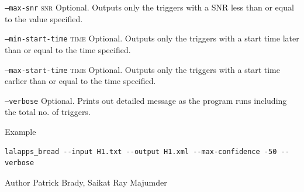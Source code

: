 \begin{entry}
\begin{entry}
\item[\texttt{--max-snr} \textsc{snr}]
Optional. Outputs only the triggers with a SNR less than or equal to the value specified.

\item[\texttt{--min-start-time} \textsc{time}]
Optional. Outputs only the triggers with a start time later than or equal to the time specified.

\item[\texttt{--max-start-time} \textsc{time}]
Optional. Outputs only the triggers with a start time earlier than or equal to the time specified.

\item[\texttt{--verbose}]
Optional. Prints out detailed message as the program runs including the total no. of triggers.

\end{entry}

\item[Example]
\begin{verbatim}
lalapps_bread --input H1.txt --output H1.xml --max-confidence -50 --verbose
\end{verbatim}

\item[Author] 
Patrick Brady, Saikat Ray Majumder
\end{entry}
